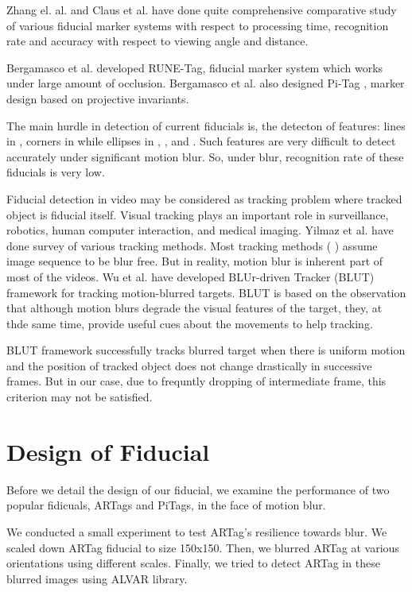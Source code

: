 \documentclass[runningheads]{llncs}
\begin{document}
Zhang el. al.\cite{Zhang:2002} and Claus et al. \cite{ClausF04} have done
quite comprehensive comparative study of various fiducial marker systems with
respect to processing time, recognition rate and accuracy with
respect to viewing angle and distance.

Bergamasco et al. \cite{runetag11} developed RUNE-Tag, fiducial marker
system which works under large amount of occlusion. Bergamasco et al. also
designed Pi-Tag \cite{Pitag13}, marker design based on projective
invariants.

The main hurdle in detection of current fiducials is, the detecton of features:
lines in \cite{ARToolkit02}, corners in \cite{Fiala05} while ellipses in
\cite{Cho:2001}, \cite{Cho97fastcolor}, \cite{runetag11} and \cite{Pitag13}.
Such features are very difficult to detect accurately under significant motion
blur. So, under blur, recognition rate of these fiducials is very low.

Fiducial detection in video may be considered as tracking problem where tracked
object is fiducial itself. Visual tracking plays an important role in
surveillance, robotics, human computer interaction, and medical
imaging\cite{Yilmaz:2006}. Yilmaz et al.\cite{Yilmaz:2006} have done survey of
various tracking methods. Most tracking methods
( \cite{Ross:2008} \cite{Wu:2009} \cite{Perez02} \cite{Mei:2009} ) assume image
sequence to be blur free. But in reality, motion blur is inherent part of most
of the videos. Wu et al.\cite{Wu:2011} have developed BLUr-driven Tracker (BLUT)
framework for tracking motion-blurred targets. BLUT is based on the observation
that although motion blurs degrade the visual features of the target, they, at
thde same time, provide useful cues about the movements to help tracking.

BLUT framework successfully tracks blurred target when there is uniform motion
and the position of tracked object does not change drastically in successive
frames. But in our case, due to frequntly dropping of intermediate frame, this
criterion may not be satisfied.

\section{Design of Fiducial}

Before we detail the design of our fiducial, we examine the performance of two
popular fidicuals, ARTags and PiTags, in the face of motion blur.

We conducted a small experiment to test ARTag's resilience towards blur.
We scaled down ARTag fiducial to size 150x150.  Then, we blurred ARTag
at various orientations using different scales. Finally, we tried to detect
ARTag in these blurred images using ALVAR library\cite{alvar}.
\end{document}
